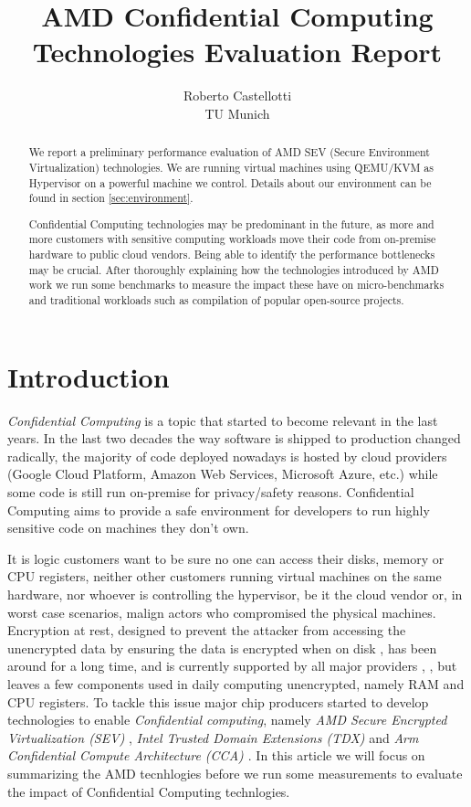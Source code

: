\documentclass[twocolumn]{article}
\begin{document}
\date{}
\title{\Large \bf AMD Confidential Computing Technologies Evaluation Report}
\author{{\rm Roberto Castellotti}\\TU Munich}
\maketitle

\begin{abstract}
We report a preliminary performance evaluation of AMD SEV (Secure Environment Virtualization) technologies.
We are running virtual machines using QEMU/KVM as Hypervisor on a powerful machine we control.
Details about our environment can be found in section \ref{sec:environment}.

Confidential Computing technologies may be predominant in the future, as more and more customers with sensitive computing workloads move their code from on-premise hardware to public cloud vendors. Being able to identify the performance bottlenecks may be crucial. After thoroughly explaining how the technologies introduced by AMD work we run some benchmarks to measure the impact these have on micro-benchmarks and traditional workloads such as compilation of popular open-source projects.
\end{abstract}

\section{Introduction}

\textit{Confidential Computing} is a topic that started to become relevant in the last years. In the last two decades the way software is shipped to production changed radically, the majority of code deployed nowadays is hosted by cloud providers (Google Cloud Platform, Amazon Web Services, Microsoft Azure, etc.) while some code is still run on-premise for privacy/safety reasons. Confidential Computing aims to provide a safe environment for developers to run highly sensitive code on machines they don't own. 

It is logic customers want to be sure no one can access their disks, memory or CPU registers, neither other customers running virtual machines on the same hardware, nor whoever is controlling the hypervisor, be it  the cloud vendor  or, in worst case scenarios, malign actors who compromised the physical machines. Encryption at rest, designed to prevent the attacker from accessing the unencrypted data by ensuring the data is encrypted when on disk \cite{azure-enc}, has been around for a long time, and is currently supported by all major providers \cite{aws-enc}, \cite{gcp-enc}, \cite{azure-enc} but leaves a few components used in daily computing unencrypted, namely RAM and CPU registers. To tackle this issue major chip producers started to develop technologies to enable \textit{Confidential computing}, namely \textit{AMD Secure Encrypted Virtualization (SEV)} \cite{memory-encryption}, \textit{Intel Trusted Domain Extensions (TDX)} \cite{tdx} and \textit{Arm Confidential Compute Architecture (CCA) \cite{cca}}. In this article we will focus on summarizing the AMD tecnhlogies before we run some measurements to evaluate the impact of Confidential Computing technlogies.
\end{document}
